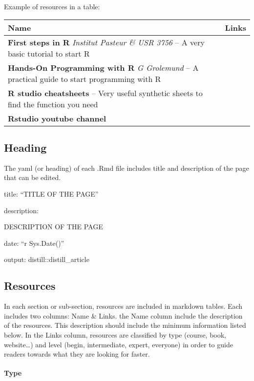 \documentclass[
]{article}
\begin{document}
Example of resources in a table:

\begin{longtable}[]{@{}
  >{\raggedright\arraybackslash}p{}
  >{\raggedright\arraybackslash}p{}@{}}
\toprule
Name & Links \\
\midrule
\endhead
\textbf{First steps in R} \emph{Institut Pasteur \& USR 3756} -- A very
basic tutorial to start R & \\
\textbf{Hands-On Programming with R} \emph{G Grolemund} -- A practical
guide to start programming with R & \\
\textbf{R studio cheatsheets} -- Very useful synthetic sheets to find
the function you need & \\
\textbf{Rstudio youtube channel} & \\
\bottomrule
\end{longtable}

\hypertarget{heading}{%
\subsection{Heading}\label{heading}}

The yaml (or heading) of each .Rmd file includes title and description
of the page that can be edited.

title: ``TITLE OF THE PAGE''

description: \textbar{}

DESCRIPTION OF THE PAGE

date: ``r Sys.Date()''

output: distill::distill\_article

\hypertarget{resources}{%
\subsection{Resources}\label{resources}}

In each section or sub-section, resources are included in markdown
tables. Each includes two columns: Name \& Links. the Name column
include the description of the resources. This description should
include the minimum information listed below. In the Links column,
resources are classified by type (course, book, website\ldots) and level
(begin, intermediate, expert, everyone) in order to guide readers
towards what they are looking for faster.

\hypertarget{type}{%
\paragraph{Type}\label{type}}
\end{document}

